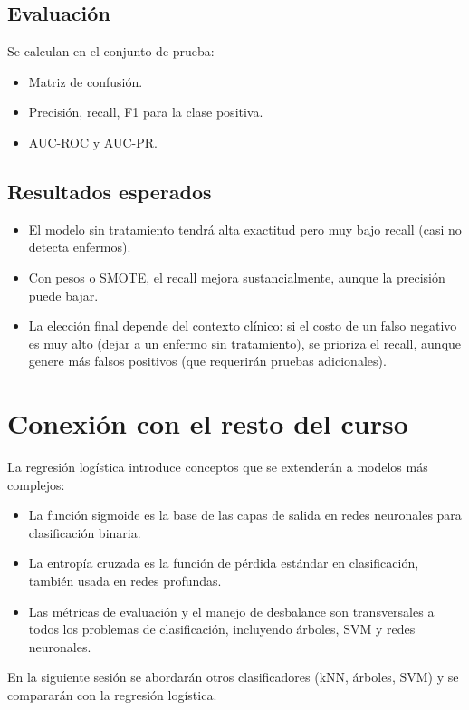 \documentclass[12pt,a4paper,openany,oneside]{book}
\begin{document}
\subsection{Evaluación}
Se calculan en el conjunto de prueba:
\begin{itemize}
    \item Matriz de confusión.
    \item Precisión, recall, F1 para la clase positiva.
    \item AUC-ROC y AUC-PR.
\end{itemize}

\subsection{Resultados esperados}
\begin{itemize}
    \item El modelo sin tratamiento tendrá alta exactitud pero muy bajo recall (casi no detecta enfermos).
    \item Con pesos o SMOTE, el recall mejora sustancialmente, aunque la precisión puede bajar.
    \item La elección final depende del contexto clínico: si el costo de un falso negativo es muy alto (dejar a un enfermo sin tratamiento), se prioriza el recall, aunque genere más falsos positivos (que requerirán pruebas adicionales).
\end{itemize}

\section{Conexión con el resto del curso}
La regresión logística introduce conceptos que se extenderán a modelos más complejos:
\begin{itemize}
    \item La función sigmoide es la base de las capas de salida en redes neuronales para clasificación binaria.
    \item La entropía cruzada es la función de pérdida estándar en clasificación, también usada en redes profundas.
    \item Las métricas de evaluación y el manejo de desbalance son transversales a todos los problemas de clasificación, incluyendo árboles, SVM y redes neuronales.
\end{itemize}
En la siguiente sesión se abordarán otros clasificadores (kNN, árboles, SVM) y se compararán con la regresión logística.
\end{document}
